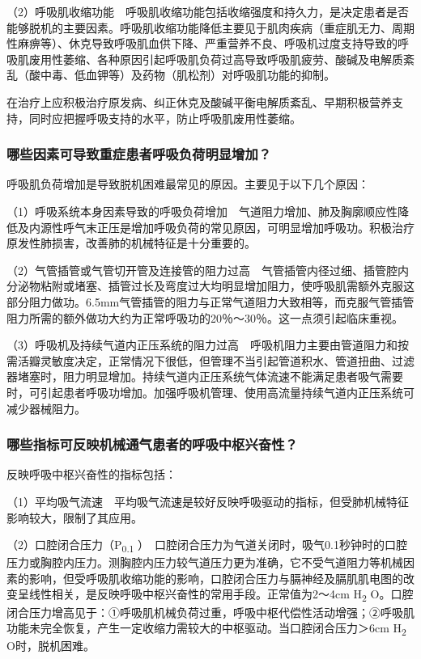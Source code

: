 （2）呼吸肌收缩功能　呼吸肌收缩功能包括收缩强度和持久力，是决定患者是否能够脱机的主要因素。呼吸肌收缩功能降低主要见于肌肉疾病（重症肌无力、周期性麻痹等）、休克导致呼吸肌血供下降、严重营养不良、呼吸机过度支持导致的呼吸肌废用性萎缩、各种原因引起呼吸肌负荷过高导致呼吸肌疲劳、酸碱及电解质紊乱（酸中毒、低血钾等）及药物（肌松剂）对呼吸肌功能的抑制。

在治疗上应积极治疗原发病、纠正休克及酸碱平衡电解质紊乱、早期积极营养支持，同时应把握呼吸支持的水平，防止呼吸肌废用性萎缩。

\subsubsection{哪些因素可导致重症患者呼吸负荷明显增加？}

呼吸肌负荷增加是导致脱机困难最常见的原因。主要见于以下几个原因：

（1）呼吸系统本身因素导致的呼吸负荷增加　气道阻力增加、肺及胸廓顺应性降低及内源性呼气末正压是增加呼吸负荷的常见原因，可明显增加呼吸功。积极治疗原发性肺损害，改善肺的机械特征是十分重要的。

（2）气管插管或气管切开管及连接管的阻力过高　气管插管内径过细、插管腔内分泌物粘附或堵塞、插管过长及弯度过大均明显增加阻力，使呼吸肌需额外克服这部分阻力做功。6.5mm气管插管的阻力与正常气道阻力大致相等，而克服气管插管阻力所需的额外做功大约为正常呼吸功的20％～30％。这一点须引起临床重视。

（3）呼吸机及持续气道内正压系统的阻力过高　呼吸机阻力主要由管道阻力和按需活瓣灵敏度决定，正常情况下很低，但管理不当引起管道积水、管道扭曲、过滤器堵塞时，阻力明显增加。持续气道内正压系统气体流速不能满足患者吸气需要时，可引起患者呼吸功增加。加强呼吸机管理、使用高流量持续气道内正压系统可减少器械阻力。

\subsubsection{哪些指标可反映机械通气患者的呼吸中枢兴奋性？}

反映呼吸中枢兴奋性的指标包括：

（1）平均吸气流速　平均吸气流速是较好反映呼吸驱动的指标，但受肺机械特征影响较大，限制了其应用。

（2）口腔闭合压力（P\textsubscript{0.1}
）　口腔闭合压力为气道关闭时，吸气0.1秒钟时的口腔压力或胸腔内压力。测胸腔内压力较气道压力更为准确，它不受气道阻力等机械因素的影响，但受呼吸肌收缩功能的影响，口腔闭合压力与膈神经及膈肌肌电图的改变呈线性相关，是反映呼吸中枢兴奋性的常用手段。正常值为2～4cm
H\textsubscript{2}
O。口腔闭合压力增高见于：①呼吸肌机械负荷过重，呼吸中枢代偿性活动增强；②呼吸肌功能未完全恢复，产生一定收缩力需较大的中枢驱动。当口腔闭合压力＞6cm
H\textsubscript{2} O时，脱机困难。

